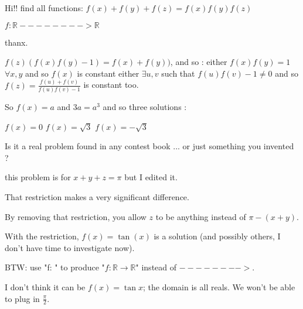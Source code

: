 \begin{solution}
	\begin{tcolorbox}Hi!!
find all functions:
$ f(x) + f(y) + f(z) = f(x)f(y)f(z)$

$ f: \mathbb{R} - - - - - - - - > \mathbb{R}$

thanx.\end{tcolorbox}

$ f(z)(f(x)f(y)-1)=f(x)+f(y))$, and so :
either $ f(x)f(y)=1$ $ \forall x,y$ and so $ f(x)$ is constant
either $ \exists u,v$ such that $ f(u)f(v)-1\neq 0$ and so $ f(z)=\frac{f(u)+f(v)}{f(u)f(v)-1}$ is constant too.

So $ f(x)=a$ and $ 3a=a^3$ and so three solutions :

$ f(x)=0$
$ f(x)=\sqrt 3$
$ f(x)=-\sqrt 3$

Is it a real problem found in any contest \/ book \/ ... or just something you invented ?
\end{solution}



\begin{solution}
	this problem is for $ x+y+z=\pi$ but I edited it.
\end{solution}



\begin{solution}
	That restriction makes a very significant difference. 

By removing that restriction, you allow $ z$ to be anything instead of $ \pi - (x+y)$. 

With the restriction, $ f(x) = \tan(x)$ is a solution (and possibly others, I don't have time to investigate now).  

BTW: use "f:  \to {}" to produce "$ f: \mathbb{R} \to \mathbb{R}$" instead of $ -------->$.
\end{solution}



\begin{solution}
	I don't think it can be $ f(x) = \tan x$; the domain is all reals. We won't be able to plug in $ \frac{\pi}{2}$.
\end{solution}



